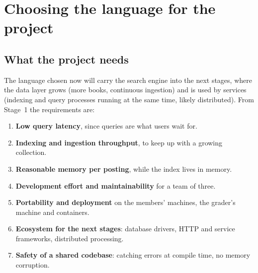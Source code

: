 \documentclass[11pt,a4paper]{article}
\begin{document}
\section{Choosing the language for the project}\label{sec:choice}

\subsection{What the project needs}
The language chosen now will carry the search engine into the next stages, where the data layer
grows (more books, continuous ingestion) and is used by services (indexing and query processes
running at the same time, likely distributed). From Stage~1 the requirements are:
\begin{enumerate}
  \item \textbf{Low query latency}, since queries are what users wait for.
  \item \textbf{Indexing and ingestion throughput}, to keep up with a growing collection.
  \item \textbf{Reasonable memory per posting}, while the index lives in memory.
  \item \textbf{Development effort and maintainability} for a team of three.
  \item \textbf{Portability and deployment} on the members' machines, the grader's machine and
        containers.
  \item \textbf{Ecosystem for the next stages}: database drivers, HTTP and service frameworks,
        distributed processing.
  \item \textbf{Safety of a shared codebase}: catching errors at compile time, no memory corruption.
\end{enumerate}
\end{document}
